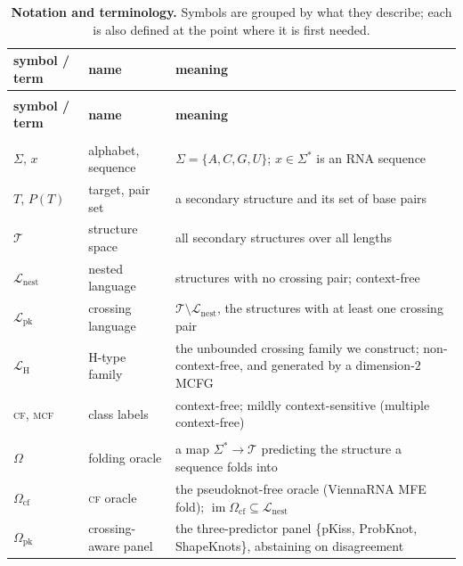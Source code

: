 \documentclass[11pt]{article}
\newcommand{\NESTED}{\ensuremath{\mathcal{L}_{\mathrm{nest}}}}
\newcommand{\PK}{\ensuremath{\mathcal{L}_{\mathrm{pk}}}}
\newcommand{\CF}{\textsc{cf}}
\newcommand{\MCF}{\textsc{mcf}}
\newcommand{\Ocf}{\ensuremath{\Omega_{\mathrm{cf}}}}
\newcommand{\Opk}{\ensuremath{\Omega_{\mathrm{pk}}}}
\begin{document}
\begingroup
\centering\footnotesize
\setlength{\abovecaptionskip}{4pt}
\setlength{\tabcolsep}{5pt}\renewcommand{\arraystretch}{1.18}
\begin{xltabular}{\linewidth}{@{}>{\raggedright\arraybackslash}p{2.35cm}>{\raggedright\arraybackslash}p{3.3cm}L@{}}
\caption{\textbf{Notation and terminology.} Symbols are grouped by what they describe; each is also defined
at the point where it is first needed.}\label{tab:notation}\\
\toprule
\textbf{symbol / term} & \textbf{name} & \textbf{meaning}\\
\midrule
\endfirsthead
{}\\
\toprule
\textbf{symbol / term} & \textbf{name} & \textbf{meaning}\\
\midrule
\endhead
{}\\
\addlinespace[2pt]
$\Sigma$, $x$ & alphabet, sequence & $\Sigma=\{A,C,G,U\}$; $x\in\Sigma^\ast$ is an RNA sequence\\
$T$, $P(T)$ & target, pair set & a secondary structure and its set of base pairs\\
$\mathcal T$ & structure space & all secondary structures over all lengths\\
$\NESTED$ & nested language & structures with no crossing pair; context-free\\
$\PK$ & crossing language & $\mathcal T\setminus\NESTED$, the structures with at least one crossing pair\\
$\mathcal L_{\mathrm H}$ & H-type family & the unbounded crossing family we construct; non-context-free, and generated by a dimension-$2$ MCFG\\
\CF, \MCF & class labels & context-free; mildly context-sensitive (multiple context-free)\\
\addlinespace[3pt]
\\
\addlinespace[2pt]
$\Omega$ & folding oracle & a map $\Sigma^\ast\!\to\mathcal T$ predicting the structure a sequence folds into\\
$\Ocf$ & \CF{} oracle & the pseudoknot-free oracle (ViennaRNA MFE fold); $\operatorname{im}\Ocf\subseteq\NESTED$\\
$\Opk$ & crossing-aware panel & the three-predictor panel \{pKiss, ProbKnot, ShapeKnots\}, abstaining on disagreement\\

\end{xltabular}
\end{document}
